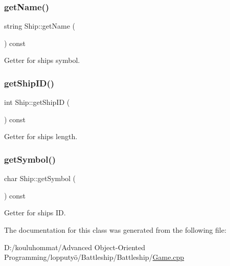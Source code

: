 \subsubsection{\texorpdfstring{get\+Name()}{getName()}}
{\footnotesize\ttfamily string Ship\+::get\+Name (\begin{DoxyParamCaption}{ }\end{DoxyParamCaption}) const\hspace{0.3cm}{\ttfamily [inline]}}



Getter for ship\textquotesingle{}s symbol. 

\mbox{\label{class_ship_add61243cfbd60ea5fc3ab79d4ae0c99d}} 
\subsubsection{\texorpdfstring{get\+Ship\+I\+D()}{getShipID()}}
{\footnotesize\ttfamily int Ship\+::get\+Ship\+ID (\begin{DoxyParamCaption}{ }\end{DoxyParamCaption}) const\hspace{0.3cm}{\ttfamily [inline]}}



Getter for ship\textquotesingle{}s length. 

\mbox{\label{class_ship_a86ea5893e49e12ceeb6ff43a6f78d86d}} 
\subsubsection{\texorpdfstring{get\+Symbol()}{getSymbol()}}
{\footnotesize\ttfamily char Ship\+::get\+Symbol (\begin{DoxyParamCaption}{ }\end{DoxyParamCaption}) const\hspace{0.3cm}{\ttfamily [inline]}}



Getter for ship\textquotesingle{}s ID. 



The documentation for this class was generated from the following file\+:\begin{DoxyCompactItemize}
\item 
D\+:/kouluhommat/\+Advanced Object-\/\+Oriented Programming/lopputyö/\+Battleship/\+Battleship/\mbox{\hyperlink{_game_8cpp}{Game.\+cpp}}\end{DoxyCompactItemize}
